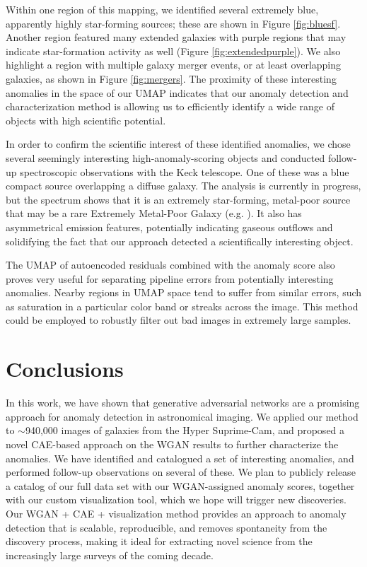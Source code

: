 \documentclass{article}
\begin{document}
Within one region of this mapping, we identified several extremely blue, apparently highly star-forming sources; these are shown in Figure \ref{fig:bluesf}.
Another region featured many extended galaxies with purple regions that may indicate star-formation activity as well (Figure \ref{fig:extendedpurple}).
We also highlight a region with multiple galaxy merger events, or at least overlapping galaxies, as shown in Figure \ref{fig:mergers}.
The proximity of these interesting anomalies in the space of our UMAP indicates that our anomaly detection and characterization method is allowing us to efficiently identify a wide range of objects with high scientific potential.

In order to confirm the scientific interest of these identified anomalies, we chose several seemingly interesting high-anomaly-scoring objects and conducted follow-up spectroscopic observations with the Keck telescope. 
One of these was a blue compact source overlapping a diffuse galaxy.
The analysis is currently in progress, but the spectrum shows that it is an extremely star-forming, metal-poor source that may be a rare Extremely Metal-Poor Galaxy (e.g. \citep{Kojima2019}).
It also has asymmetrical emission features, potentially indicating gaseous outflows and solidifying the fact that our approach detected a scientifically interesting object.

The UMAP of autoencoded residuals combined with the anomaly score also proves very useful for separating pipeline errors from potentially interesting anomalies.
Nearby regions in UMAP space tend to suffer from similar errors, such as saturation in a particular color band or streaks across the image.
This method could be employed to robustly filter out bad images in extremely large samples.

\section{Conclusions}

In this work, we have shown that generative adversarial networks are a promising approach for anomaly detection in astronomical imaging.
We applied our method to $\sim$940,000 images of galaxies from the Hyper Suprime-Cam, and proposed a novel CAE-based approach on the WGAN results to further characterize the anomalies.
We have identified and catalogued a set of interesting anomalies, and performed follow-up observations on several of these.
We plan to publicly release a catalog of our full data set with our WGAN-assigned anomaly scores, together with our custom visualization tool, which we hope will trigger new discoveries. 
Our WGAN + CAE + visualization method provides an approach to anomaly detection that is scalable, reproducible, and removes spontaneity from the discovery process, making it ideal for extracting novel science from the increasingly large surveys of the coming decade.
\end{document}
